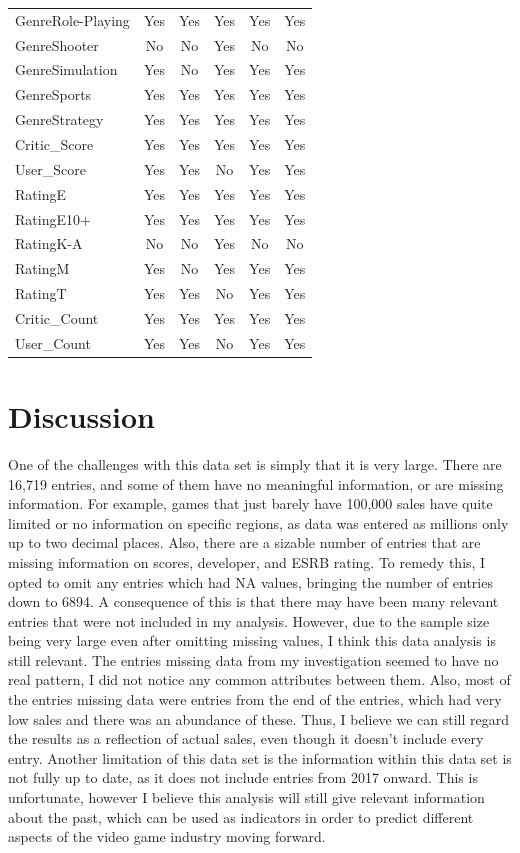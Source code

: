 \documentclass[12pt]{article}
\begin{document}
\begin{table}[ht]
\begin{tabular}{lccccc}
    GenreRole-Playing & Yes & Yes & Yes & Yes & Yes \\
    GenreShooter & No & No & Yes & No & No \\
    GenreSimulation & Yes & No & Yes & Yes & Yes \\
    GenreSports & Yes & Yes & Yes & Yes & Yes \\
    GenreStrategy & Yes & Yes & Yes & Yes & Yes \\
    Critic\_Score & Yes & Yes & Yes & Yes & Yes \\
    User\_Score & Yes & Yes & No & Yes & Yes \\
    RatingE & Yes & Yes & Yes & Yes & Yes \\
    RatingE10+ & Yes & Yes & Yes & Yes & Yes \\
    RatingK-A & No & No & Yes & No & No \\
    RatingM & Yes & No & Yes & Yes & Yes \\
    RatingT & Yes & Yes & No & Yes & Yes \\
    Critic\_Count & Yes & Yes & Yes & Yes & Yes \\
    User\_Count & Yes & Yes & No & Yes & Yes \\
    \hline
  \end{tabular}
\end{table}




\section{Discussion}
\label{sec:disc}

One of the challenges with this data set is simply that it is very large. There are 16,719 entries, and some of them have no meaningful 
information, or are missing information. For example, games that just barely have 100,000 sales have quite limited or no information on 
specific regions, as data was entered as millions only up to two decimal places. Also, there are a sizable number of entries that are 
missing information on scores, developer, and ESRB rating. 
To remedy this, I opted to omit any entries which had NA values, bringing the number of entries down to 6894. 
A consequence of this is that there may have been many relevant entries that were not included in my analysis.
However, due to the sample size being very large even after omitting missing values, I think this data analysis is still relevant.
The entries missing data from my investigation seemed to have no real pattern, I did not notice any common attributes between them.
Also, most of the entries missing data were entries from the end of the entries, which had very low sales and there was an abundance of these.
Thus, I believe we can still regard the results as a reflection of actual sales, even though it doesn't include every entry.
Another limitation of this data set is the information within this data set is not fully up to date, as it does not include entries from 2017 
onward. This is unfortunate, however I believe this analysis will still give relevant information about the past, which can be used as 
indicators in order to predict different aspects of the video game industry moving forward.




\end{document}
